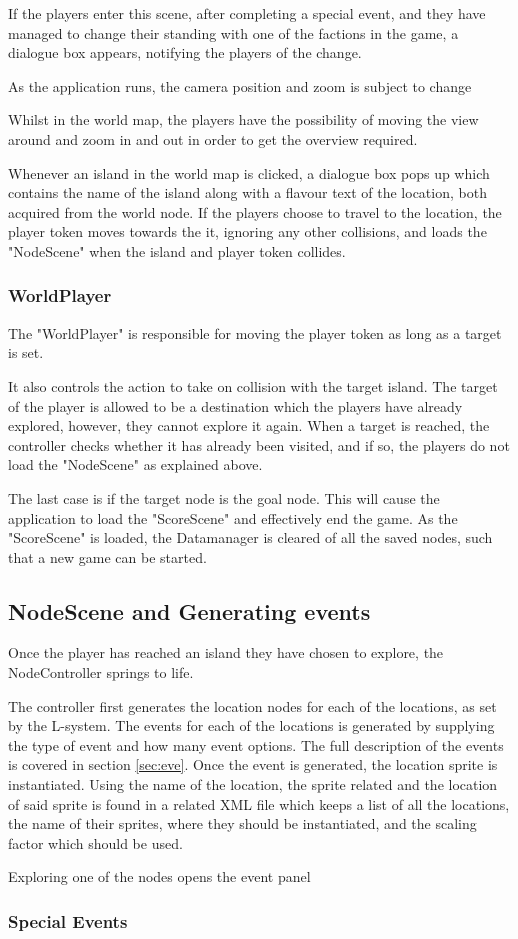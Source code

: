 If the players enter this scene, after completing a special event, and they have managed to change their standing with one of the factions in the game, a dialogue box appears, notifying the players of the change.

As the application runs, the camera position and zoom is subject to change 

Whilst in the world map, the players have the possibility of moving the view around and zoom in and out in order to get the overview required.

Whenever an island in the world map is clicked, a dialogue box pops up which contains the name of the island along with a flavour text of the location, both acquired from the world node. 
If the players choose to travel to the location, the player token moves towards the it, ignoring any other collisions, and loads the "NodeScene" when the island and player token collides. 

\subsubsection{WorldPlayer}
The "WorldPlayer" is responsible for moving the player token as long as a target is set. 

It also controls the action to take on collision with the target island. The target of the player is allowed to be a destination which the players have already explored, however, they cannot explore it again. When a target is reached, the controller checks whether it has already been visited, and if so, the players do not load the "NodeScene" as explained above.

The last case is if the target node is the goal node. This will cause the application to load the "ScoreScene" and effectively end the game.
As the "ScoreScene" is loaded, the Datamanager is cleared of all the saved nodes, such that a new game can be started.

\subsection{NodeScene and Generating events}
Once the player has reached an island they have chosen to explore, the NodeController springs to life. 

The controller first generates the location nodes for each of the locations, as set by the L-system.
The events for each of the locations is generated by supplying the type of event and how many event options. The full description of the events is covered in section \ref{sec:eve}.
Once the event is generated, the location sprite is instantiated. Using the name of the location, the sprite related and the location of said sprite is found in a related XML file which keeps a list of all the locations, the name of their sprites, where they should be instantiated, and the scaling factor which should be used.

Exploring one of the nodes opens the event panel

\subsubsection{Special Events}
